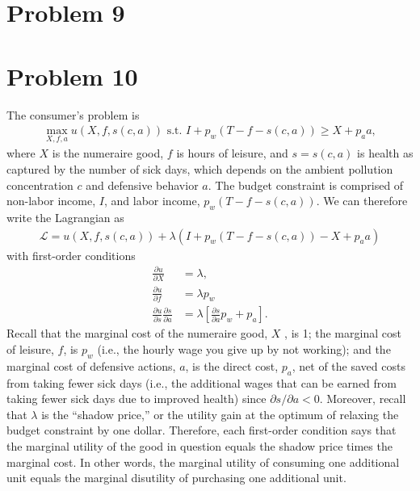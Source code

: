 \documentclass[12pt]{article}
\begin{document}
\section*{Problem 9}

\section*{Problem 10}
The consumer’s problem is
\begin{align*}
	\max_{X, f, a} u(X, f, s(c,a)) \text{ s.t. } I + p_w(T-f-s(c,a)) \geq X + p_a a,
\end{align*}
where $X$ is the numeraire good, $f$ is hours of leisure, and $s=s(c,a)$ is health as captured by the number of sick days, which depends on the ambient pollution concentration $c$ and defensive behavior $a$. The budget constraint is comprised of non-labor income, $I$, and labor income, $p_w(T-f-s(c,a))$. We can therefore write the Lagrangian as
\begin{align*}
	\mathcal{L} = u(X, f, s(c,a)) + \lambda(I + p_w(T-f-s(c,a)) - X + p_a a)
\end{align*}
with first-order conditions
\begin{align}
	\frac{\partial u}{\partial X} &= \lambda, \\
	\frac{\partial u}{\partial f} &= \lambda p_w \\
	\frac{\partial u}{\partial s} \frac{\partial s}{\partial a} &= \lambda \left[ \frac{\partial s}{\partial a} p_w + p_a  \right].
\end{align}
Recall that the marginal cost of the numeraire good, $X$ , is 1; the marginal cost of leisure, $f$, is $p_w$ (i.e., the hourly wage you give up by not working); and the marginal cost of defensive actions, $a$, is the direct cost, $p_a$, net of the saved costs from taking fewer sick days (i.e., the additional wages that can be earned from taking fewer sick days due to improved health) since $\partial s/\partial a < 0$. Moreover, recall that $\lambda$ is the ``shadow price,'' or the utility gain at the optimum of relaxing the budget constraint by one dollar. Therefore, each first-order condition says that the marginal utility of the good in question equals the shadow price times the marginal cost. In other words, the marginal utility of consuming one additional unit equals the marginal disutility of purchasing one additional unit.
\end{document}
